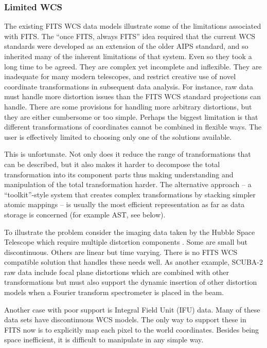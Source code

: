 \documentclass[final,authoryear,5p,times,twocolumn]{elsarticle}
\begin{document}
{{\subsubsection{Limited WCS\label{sec:wcs}}


The existing FITS WCS data models illustrate some of the limitations
associated with FITS. The ``once FITS, always FITS'' idea required that
the current WCS standards were developed as an extension of the older
AIPS standard, and so inherited many of the inherent limitations of
that system. Even so they took a long time to be agreed. They are
complex yet incomplete and inflexible. They are inadequate for many
modern telescopes, and restrict creative use of novel coordinate
transformations in subsequent data analysis. For instance, raw data
must handle more distortion issues than the FITS WCS standard
projections can handle. There are some provisions for handling more
arbitrary distortions, but they are either cumbersome or too
simple. Perhaps the biggest limitation is that different
transformations of coordinates cannot be combined in flexible
ways. The user is effectively limited to choosing only one of the solutions
available.


This is unfortunate. Not only does it reduce the range of
transformations that can be described, but it also makes it harder to
decompose the total transformation into its component parts thus making
understanding and manipulation of the total transformation harder. The
alternative approach -- a ``toolkit''-style system that creates complex
transformations by stacking simpler atomic mappings -- is usually the
most efficient representation as far as data storage is concerned
(for example AST, see below).


To illustrate the problem consider the imaging data taken by the 
Hubble Space Telescope which require multiple distortion components \citep[see e.g.,][]{2013ASPC..475...49H}.
Some are small but discontinuous. Others are linear but time varying.
There is no FITS WCS compatible solution that handles these needs well.
As another example, SCUBA-2 raw data \citep[see
e.g.,][]{2013MNRAS.430.2513H} include focal plane distortions which are
combined with other transformations but must also support the dynamic
insertion of other distortion models when a Fourier transform
spectrometer \citep{2010SPIE.7741E..67G} is placed in the beam.


Another case with poor support is Integral Field Unit (IFU) data.
Many of these data sets
have discontinuous WCS models. The only way to support these in FITS
now is to explicitly map each pixel to the world coordinates. Besides
being space inefficient, it is difficult to manipulate in any simple
way.


}}
\end{document}
